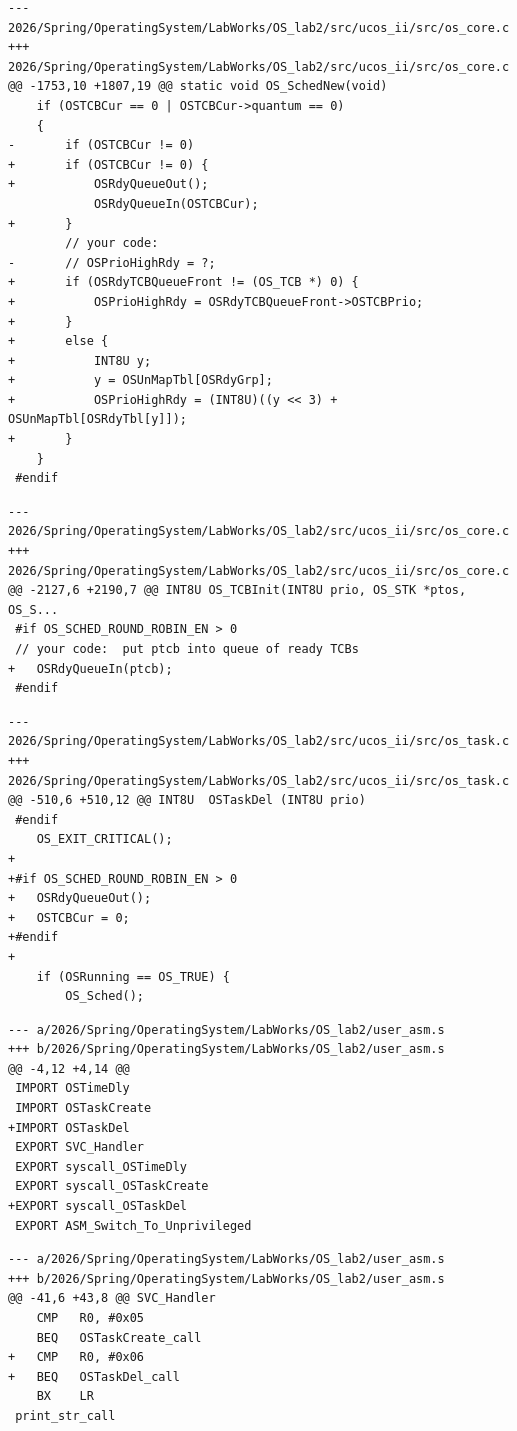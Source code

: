 \documentclass[12pt,a4paper]{article}
\begin{document}
\begin{lstlisting}[style=diffstyle,caption={os\_core.c --- hunk -1753 +1807}]
--- 2026/Spring/OperatingSystem/LabWorks/OS_lab2/src/ucos_ii/src/os_core.c
+++ 2026/Spring/OperatingSystem/LabWorks/OS_lab2/src/ucos_ii/src/os_core.c
@@ -1753,10 +1807,19 @@ static void OS_SchedNew(void)
 	if (OSTCBCur == 0 | OSTCBCur->quantum == 0)
 	{
-		if (OSTCBCur != 0)
+		if (OSTCBCur != 0) {
+			OSRdyQueueOut();
 			OSRdyQueueIn(OSTCBCur);
+		}
 		// your code:
-		// OSPrioHighRdy = ?;
+		if (OSRdyTCBQueueFront != (OS_TCB *) 0) {
+			OSPrioHighRdy = OSRdyTCBQueueFront->OSTCBPrio;
+		}
+		else {
+			INT8U y;
+			y = OSUnMapTbl[OSRdyGrp];
+			OSPrioHighRdy = (INT8U)((y << 3) + OSUnMapTbl[OSRdyTbl[y]]);
+		}
 	}
 #endif
\end{lstlisting}

\begin{lstlisting}[style=diffstyle,caption={os\_core.c --- hunk -2127 +2190}]
--- 2026/Spring/OperatingSystem/LabWorks/OS_lab2/src/ucos_ii/src/os_core.c
+++ 2026/Spring/OperatingSystem/LabWorks/OS_lab2/src/ucos_ii/src/os_core.c
@@ -2127,6 +2190,7 @@ INT8U OS_TCBInit(INT8U prio, OS_STK *ptos, OS_S...
 #if OS_SCHED_ROUND_ROBIN_EN > 0
 // your code:  put ptcb into queue of ready TCBs
+	OSRdyQueueIn(ptcb);
 #endif
\end{lstlisting}

\begin{lstlisting}[style=diffstyle,caption={os\_task.c --- hunk -510 +510}]
--- 2026/Spring/OperatingSystem/LabWorks/OS_lab2/src/ucos_ii/src/os_task.c
+++ 2026/Spring/OperatingSystem/LabWorks/OS_lab2/src/ucos_ii/src/os_task.c
@@ -510,6 +510,12 @@ INT8U  OSTaskDel (INT8U prio)
 #endif
 	OS_EXIT_CRITICAL();
+
+#if OS_SCHED_ROUND_ROBIN_EN > 0
+	OSRdyQueueOut();
+	OSTCBCur = 0;
+#endif
+
 	if (OSRunning == OS_TRUE) {
 		OS_Sched();
\end{lstlisting}

\begin{lstlisting}[style=diffstyle,caption={user\_asm.s --- hunk -4 +4}]
--- a/2026/Spring/OperatingSystem/LabWorks/OS_lab2/user_asm.s
+++ b/2026/Spring/OperatingSystem/LabWorks/OS_lab2/user_asm.s
@@ -4,12 +4,14 @@
 IMPORT OSTimeDly
 IMPORT OSTaskCreate
+IMPORT OSTaskDel
 EXPORT SVC_Handler
 EXPORT syscall_OSTimeDly
 EXPORT syscall_OSTaskCreate
+EXPORT syscall_OSTaskDel
 EXPORT ASM_Switch_To_Unprivileged
\end{lstlisting}

\begin{lstlisting}[style=diffstyle,caption={user\_asm.s --- hunk -41 +43}]
--- a/2026/Spring/OperatingSystem/LabWorks/OS_lab2/user_asm.s
+++ b/2026/Spring/OperatingSystem/LabWorks/OS_lab2/user_asm.s
@@ -41,6 +43,8 @@ SVC_Handler
 	CMP   R0, #0x05
 	BEQ   OSTaskCreate_call
+	CMP   R0, #0x06
+	BEQ   OSTaskDel_call
 	BX    LR
 print_str_call
\end{lstlisting}
\end{document}
